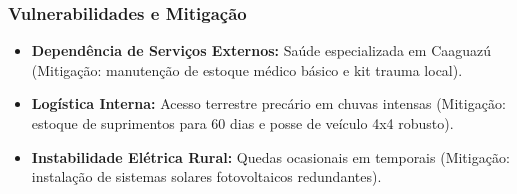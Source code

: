 \subsubsection{Vulnerabilidades e
Mitigação}

\begin{itemize}
\tightlist
\item
  \textbf{Dependência de Serviços Externos:} Saúde especializada em
  Caaguazú (Mitigação: manutenção de estoque médico básico e kit trauma
  local).
\item
  \textbf{Logística Interna:} Acesso terrestre precário em chuvas
  intensas (Mitigação: estoque de suprimentos para 60 dias e posse de
  veículo 4x4 robusto).
\item
  \textbf{Instabilidade Elétrica Rural:} Quedas ocasionais em temporais
  (Mitigação: instalação de sistemas solares fotovoltaicos redundantes).
\end{itemize}

